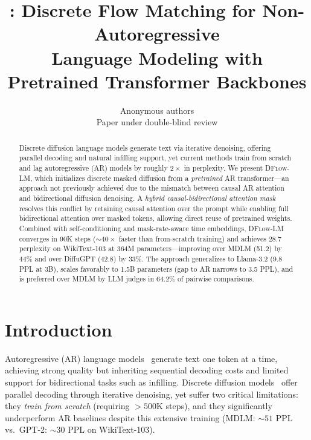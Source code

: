 \documentclass{article}
\title{\ours{}: Discrete Flow Matching for Non-Autoregressive \\ Language Modeling with Pretrained Transformer Backbones}
\author{Anonymous authors\\Paper under double-blind review}
\newcommand{\ours}{\textsc{DFlow-LM}}
\begin{document}
\ifcolmsubmission
\linenumbers
\fi

\maketitle

\begin{abstract}
Discrete diffusion language models generate text via iterative denoising, offering parallel decoding and natural infilling support, yet current methods train from scratch and lag autoregressive (AR) models by roughly $2{\times}$ in perplexity.
We present \ours{}, which initializes discrete masked diffusion from a \emph{pretrained} AR transformer---an approach not previously achieved due to the mismatch between causal AR attention and bidirectional diffusion denoising.
A \emph{hybrid causal-bidirectional attention mask} resolves this conflict by retaining causal attention over the prompt while enabling full bidirectional attention over masked tokens, allowing direct reuse of pretrained weights.
Combined with self-conditioning and mask-rate-aware time embeddings, \ours{} converges in 90K steps (${\sim}40{\times}$ faster than from-scratch training) and achieves 28.7 perplexity on WikiText-103 at 364M parameters---improving over MDLM (51.2) by 44\% and over DiffuGPT (42.8) by 33\%.
The approach generalizes to Llama-3.2 (9.8 PPL at 3B), scales favorably to 1.5B parameters (gap to AR narrows to 3.5 PPL), and is preferred over MDLM by LLM judges in 64.2\% of pairwise comparisons.
\end{abstract}

\section{Introduction}
\label{sec:intro}

Autoregressive (AR) language models~\citep{radford2019language, brown2020language} generate text one token at a time, achieving strong quality but inheriting sequential decoding costs and limited support for bidirectional tasks such as infilling.
Discrete diffusion models~\citep{austin2021structured, sahoo2024simple, lou2024discrete} offer parallel decoding through iterative denoising, yet suffer two critical limitations: they \emph{train from scratch} (requiring ${>}500$K steps), and they significantly underperform AR baselines despite this extensive training (MDLM: ${\sim}51$ PPL vs.\ GPT-2: ${\sim}30$ PPL on WikiText-103).
\end{document}
